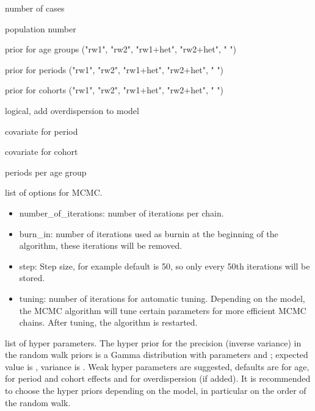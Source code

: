\documentclass[a4paper]{book}
\begin{document}
\begin{Arguments}
\begin{ldescription}
\item[\code{cases}] number of cases

\item[\code{population}] population number

\item[\code{age}] prior for age groups ("rw1", "rw2", "rw1+het", "rw2+het", " ")

\item[\code{period}] prior for periods ("rw1", "rw2", "rw1+het", "rw2+het", " ")

\item[\code{cohort}] prior for cohorts ("rw1", "rw2", "rw1+het", "rw2+het", " ")

\item[\code{overdisp}] logical, add overdispersion to model

\item[\code{period\_covariate}] covariate for period

\item[\code{cohort\_covariate}] covariate for cohort

\item[\code{periods\_per\_agegroup}] periods per age group

\item[\code{mcmc.options}] list of options for MCMC. \begin{itemize}
\item{} number\_of\_iterations: number of iterations per chain. \item{} burn\_in: number of iterations used as burnin at the beginning of the algorithm, these iterations will be removed. \item{} step: Step size, for example default is 50, so only every 50th iterations will be stored. \item{} tuning: number of iterations for automatic tuning. Depending on the model, the MCMC algorithm will tune certain parameters for more efficient MCMC chains. After tuning, the algorithm is restarted.
\end{itemize}


\item[\code{hyperpar}] list of hyper parameters. The hyper prior for the precision (inverse variance) in the random walk priors is a Gamma distribution with parameters  and ; expected value is , variance is . Weak hyper parameters are suggested, defaults are  for age,  for period and cohort effects and  for overdispersion (if added). It is recommended to choose the hyper priors depending on the model, in particular on the order of the random walk.


\end{ldescription}
\end{Arguments}
\end{document}
